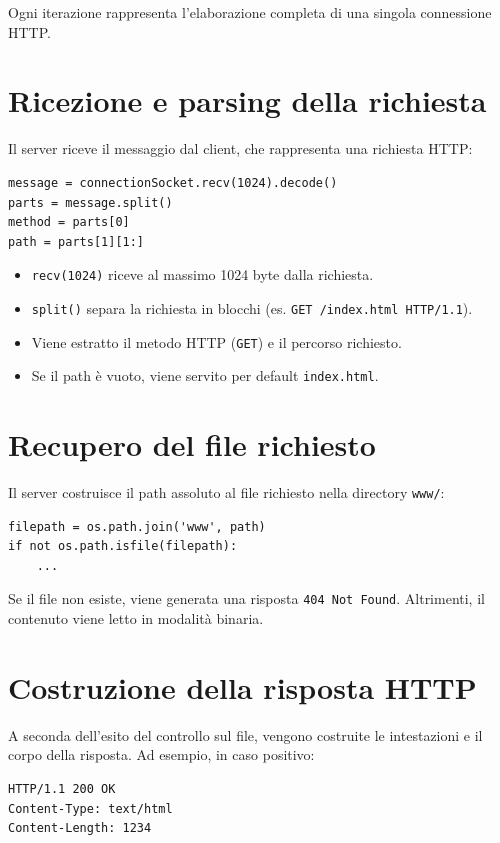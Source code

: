 \documentclass[a4paper,12pt]{report}
\begin{document}
Ogni iterazione rappresenta l’elaborazione completa di una singola connessione HTTP.


\section{Ricezione e parsing della richiesta}

Il server riceve il messaggio dal client, che rappresenta una richiesta HTTP:

\begin{verbatim}
message = connectionSocket.recv(1024).decode()
parts = message.split()
method = parts[0]
path = parts[1][1:]
\end{verbatim}

\begin{itemize}
    \item \texttt{recv(1024)} riceve al massimo 1024 byte dalla richiesta.
    \item \texttt{split()} separa la richiesta in blocchi (es. \texttt{GET /index.html HTTP/1.1}).
    \item Viene estratto il metodo HTTP (\texttt{GET}) e il percorso richiesto.
    \item Se il path è vuoto, viene servito per default \texttt{index.html}.
\end{itemize}


\section{Recupero del file richiesto}

Il server costruisce il path assoluto al file richiesto nella directory \texttt{www/}:

\begin{verbatim}
filepath = os.path.join('www', path)
if not os.path.isfile(filepath):
    ...
\end{verbatim}

Se il file non esiste, viene generata una risposta \texttt{404 Not Found}. Altrimenti, il contenuto viene letto in modalità binaria.


\section{Costruzione della risposta HTTP}

A seconda dell’esito del controllo sul file, vengono costruite le intestazioni e il corpo della risposta. Ad esempio, in caso positivo:

\begin{verbatim}
HTTP/1.1 200 OK
Content-Type: text/html
Content-Length: 1234
\end{verbatim}
\end{document}
